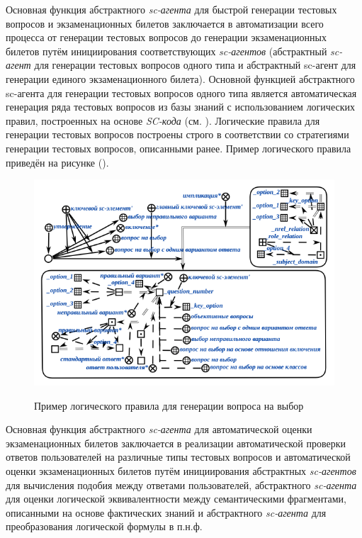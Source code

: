 Основная функция абстрактного \textit{sc-агента} для быстрой генерации тестовых вопросов и экзаменационных билетов заключается в автоматизации всего процесса от генерации тестовых вопросов до генерации экзаменационных билетов путём инициирования соответствующих \textit{sc-агентов} (абстрактный \textit{sc-агент} для генерации тестовых вопросов одного типа и абстрактный sc-агент для генерации единого экзаменационного билета). Основной функцией абстрактного sc-агента для генерации тестовых вопросов одного типа является автоматическая генерация ряда тестовых вопросов из базы знаний с использованием логических правил, построенных на основе \textit{SC-кода} (см. ). Логические правила для генерации тестовых вопросов построены строго в соответствии со стратегиями генерации тестовых вопросов, описанными ранее. Пример логического правила приведён на рисунке (\textit{}).

\begin{figure}[H]
	\caption{Пример логического правила для генерации вопроса на выбор}
	\includegraphics[scale=1]{author/part7/figures/logic_rule_example.png}
	\label{fig:LRE_example}
\end{figure}

Основная функция абстрактного \textit{sc-агента} для автоматической оценки экзаменационных билетов заключается в реализации автоматической проверки ответов пользователей на различные типы тестовых вопросов и автоматической оценки экзаменационных билетов путём инициирования абстрактных \textit{sc-агентов} для вычисления подобия между ответами пользователей, абстрактного \textit{sc-агента} для оценки логической эквивалентности между семантическими фрагментами, описанными на основе фактических знаний и абстрактного \textit{sc-агента} для преобразования логической формулы в п.н.ф.